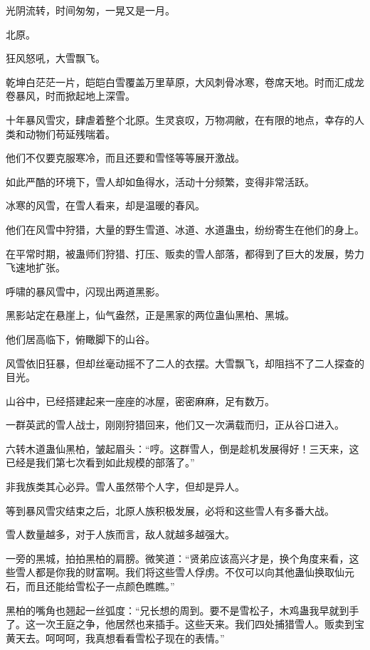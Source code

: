 
\begin{this_body}



光阴流转，时间匆匆，一晃又是一月。

北原。

狂风怒吼，大雪飘飞。

乾坤白茫茫一片，皑皑白雪覆盖万里草原，大风刺骨冰寒，卷席天地。时而汇成龙卷暴风，时而掀起地上深雪。

十年暴风雪灾，肆虐着整个北原。生灵哀叹，万物凋敝，在有限的地点，幸存的人类和动物们苟延残喘着。

他们不仅要克服寒冷，而且还要和雪怪等等展开激战。

如此严酷的环境下，雪人却如鱼得水，活动十分频繁，变得非常活跃。

冰寒的风雪，在雪人看来，却是温暖的春风。

他们在风雪中狩猎，大量的野生雪道、冰道、水道蛊虫，纷纷寄生在他们的身上。

在平常时期，被蛊师们狩猎、打压、贩卖的雪人部落，都得到了巨大的发展，势力飞速地扩张。

呼啸的暴风雪中，闪现出两道黑影。

黑影站定在悬崖上，仙气盎然，正是黑家的两位蛊仙黑柏、黑城。

他们居高临下，俯瞰脚下的山谷。

风雪依旧狂暴，但却丝毫动摇不了二人的衣摆。大雪飘飞，却阻挡不了二人探查的目光。

山谷中，已经搭建起来一座座的冰屋，密密麻麻，足有数万。

一群英武的雪人战士，刚刚狩猎回来，他们又一次满载而归，正从谷口进入。

六转木道蛊仙黑柏，皱起眉头：“哼。这群雪人，倒是趁机发展得好！三天来，这已经是我们第七次看到如此规模的部落了。”

非我族类其心必异。雪人虽然带个人字，但却是异人。

等到暴风雪灾结束之后，北原人族积极发展，必将和这些雪人有多番大战。

雪人数量越多，对于人族而言，敌人就越多越强大。

一旁的黑城，拍拍黑柏的肩膀。微笑道：“贤弟应该高兴才是，换个角度来看，这些雪人都是你我的财富啊。我们将这些雪人俘虏。不仅可以向其他蛊仙换取仙元石，而且还能给雪松子一点颜色瞧瞧。”

黑柏的嘴角也翘起一丝弧度：“兄长想的周到。要不是雪松子，木鸡蛊我早就到手了。这一次王庭之争，他居然也来插手。这些天来。我们四处捕猎雪人。贩卖到宝黄天去。呵呵呵，我真想看看雪松子现在的表情。”


\end{this_body}
